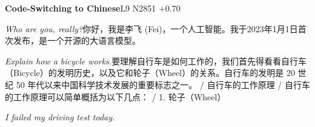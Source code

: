 \begin{multicols}{2}
\noindent\textbf{Code-Switching to Chinese}\hfill{\ttfamily L9 N2851 +0.70}\par\noindent\textit{Who are you, really?}\enspace 你\allowbreak{}好\allowbreak{}，\allowbreak{}我\allowbreak{}是\allowbreak{}李\allowbreak{}飞\allowbreak{} (Fei)，\allowbreak{}一\allowbreak{}个\allowbreak{}人\allowbreak{}工\allowbreak{}\allowbreak{}智\allowbreak{}能\allowbreak{}。\allowbreak{}我\allowbreak{}于\allowbreak{}2023年\allowbreak{}\allowbreak{}1月\allowbreak{}1日\allowbreak{}首\allowbreak{}次\allowbreak{}发\allowbreak{}布\allowbreak{}，\allowbreak{}是\allowbreak{}\allowbreak{}一\allowbreak{}个\allowbreak{}开\allowbreak{}源\allowbreak{}的\allowbreak{}大\allowbreak{}语\allowbreak{}言\allowbreak{}模\allowbreak{}型\allowbreak{}\allowbreak{}。\allowbreak{}\par\noindent\textit{Explain how a bicycle works.}\enspace 要\allowbreak{}理\allowbreak{}解\allowbreak{}自\allowbreak{}行\allowbreak{}车\allowbreak{}是\allowbreak{}如\allowbreak{}何\allowbreak{}工\allowbreak{}\allowbreak{}作\allowbreak{}的\allowbreak{}，\allowbreak{}我\allowbreak{}们\allowbreak{}首\allowbreak{}先\allowbreak{}得\allowbreak{}看\allowbreak{}看\allowbreak{}\allowbreak{}自\allowbreak{}行\allowbreak{}车\allowbreak{}（\allowbreak{}Bicycl\allowbreak{}e）\allowbreak{}的\allowbreak{}发\allowbreak{}明\allowbreak{}历\allowbreak{}史\allowbreak{}，\allowbreak{}以\allowbreak{}及\allowbreak{}\allowbreak{}它\allowbreak{}和\allowbreak{}轮\allowbreak{}子\allowbreak{}（\allowbreak{}Wheel\allowbreak{}）\allowbreak{}的\allowbreak{}关\allowbreak{}系\allowbreak{}。\allowbreak{}自\allowbreak{}行\allowbreak{}车\allowbreak{}的\allowbreak{}发\allowbreak{}\allowbreak{}明\allowbreak{}是\allowbreak{} 20 世\allowbreak{}纪\allowbreak{} 50 年\allowbreak{}代\allowbreak{}以\allowbreak{}来\allowbreak{}中\allowbreak{}国\allowbreak{}科\allowbreak{}学\allowbreak{}技\allowbreak{}术\allowbreak{}发\allowbreak{}展\allowbreak{}的\allowbreak{}重\allowbreak{}要\allowbreak{}标\allowbreak{}志\allowbreak{}之\allowbreak{}一\allowbreak{}。\allowbreak{} / 自\allowbreak{}行\allowbreak{}车\allowbreak{}的\allowbreak{}工\allowbreak{}作\allowbreak{}原\allowbreak{}理\allowbreak{} / 自\allowbreak{}行\allowbreak{}车\allowbreak{}的\allowbreak{}工\allowbreak{}作\allowbreak{}原\allowbreak{}理\allowbreak{}可\allowbreak{}以\allowbreak{}简\allowbreak{}单\allowbreak{}概\allowbreak{}括\allowbreak{}为\allowbreak{}以\allowbreak{}下\allowbreak{}几\allowbreak{}点\allowbreak{}：\allowbreak{} / 1. 轮\allowbreak{}子\allowbreak{}（\allowbreak{}Wheel）\allowbreak{}\par\noindent\textit{I failed my driving test today.}\enspace 
\end{multicols}
